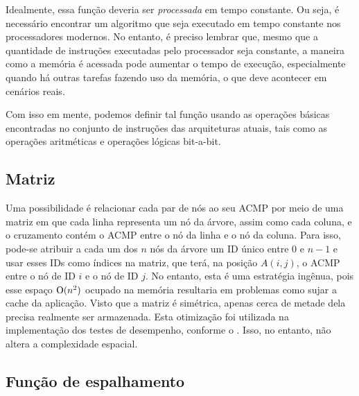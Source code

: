 Idealmente, essa função \ACMPIDs deveria ser \textit{processada} em tempo constante.
Ou seja, é necessário encontrar um algoritmo que seja executado em tempo constante nos processadores modernos.
No entanto, é preciso lembrar que, mesmo que a quantidade de instruções executadas pelo processador seja constante,
a maneira como a memória é acessada pode aumentar o tempo de execução, especialmente quando há outras tarefas fazendo uso da memória, o que deve acontecer em cenários reais.

Com isso em mente, podemos definir tal função usando as operações básicas encontradas no conjunto de instruções das arquiteturas atuais,
tais como as operações aritméticas e operações lógicas bit-a-bit.

\subsection{Matriz}

Uma possibilidade é relacionar cada par de nós ao seu ACMP por meio de uma matriz
em que cada linha representa um nó da árvore, assim como cada coluna, e o cruzamento contém o ACMP entre o nó da linha e o nó da coluna.
Para isso, pode-se atribuir a cada um dos $n$ nós da árvore um ID único entre $0$ e $n-1$ e usar esses IDs como índices na matriz,
que terá, na posição $A(i,j)$, o ACMP entre o nó de ID $i$ e o nó de ID $j$.
No entanto, esta é uma estratégia ingênua, pois esse espaço $\operatorname{O}(n^2)$ ocupado na memória resultaria em problemas como sujar a cache da aplicação.
Visto que a matriz é simétrica, apenas cerca de metade dela precisa realmente ser armazenada.
Esta otimização foi utilizada na implementação dos testes de desempenho, conforme o .
Isso, no entanto, não altera a complexidade espacial.



\subsection{Função de espalhamento}

